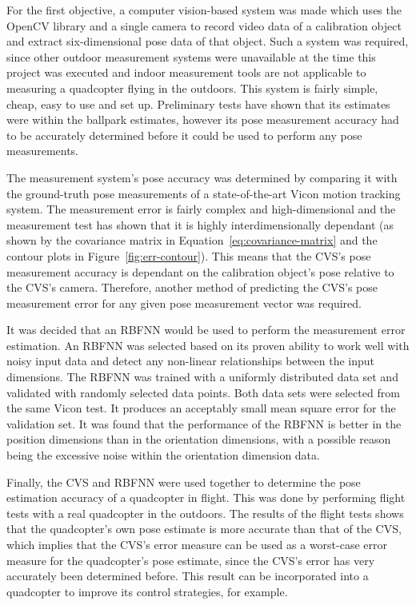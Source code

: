 For the first objective, a computer vision-based system was made which uses the OpenCV library and a single camera to record video data of a calibration object and extract six-dimensional pose data of that object. Such a system was required, since other outdoor measurement systems were unavailable at the time this project was executed and indoor measurement tools are not applicable to measuring a quadcopter flying in the outdoors. This system is fairly simple, cheap, easy to use and set up. Preliminary tests have shown that its estimates were within the ballpark estimates, however its pose measurement accuracy had to be accurately determined before it could be used to perform any pose measurements. 

The measurement system's pose accuracy was determined by comparing it with the ground-truth pose measurements of a state-of-the-art Vicon motion tracking system. The measurement error is fairly complex and high-dimensional and the measurement test has shown that it is highly interdimensionally dependant (as shown by the covariance matrix in Equation~\ref{eq:covariance-matrix} and the contour plots in Figure~\ref{fig:err-contour}). This means that the CVS's pose measurement accuracy is dependant on the calibration object's pose relative to the CVS's camera. Therefore, another method of predicting the CVS's pose measurement error for any given pose measurement vector was required.

It was decided that an RBFNN would be used to perform the measurement error estimation. An RBFNN was selected based on its proven ability to work well with noisy input data and detect any non-linear relationships between the input dimensions. The RBFNN was trained with a uniformly distributed data set and validated with randomly selected data points. Both data sets were selected from the same Vicon test. It produces an acceptably small mean square error for the validation set. It was found that the performance of the RBFNN is better in the position dimensions than in the orientation dimensions, with a possible reason being the excessive noise within the orientation dimension data. 

Finally, the CVS and RBFNN were used together to determine the pose estimation accuracy of a quadcopter in flight. This was done by performing flight tests with a real quadcopter in the outdoors. The results of the flight tests shows that the quadcopter's own pose estimate is more accurate than that of the CVS, which implies that the CVS's error measure can be used as a worst-case error measure for the quadcopter's pose estimate, since the CVS's error has very accurately been determined before. This result can be incorporated into a quadcopter to improve its control strategies, for example. 

